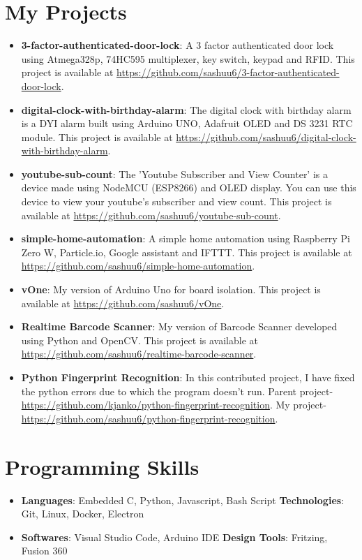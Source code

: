 \documentclass[letterpaper,11pt]{article}
\newcommand{\resumeItem}[2]{
	\item\small{
    		\textbf{#1}{: #2 \vspace{-2pt}}
  	}
}
\newcommand{\resumeSubItem}[2]{\resumeItem{#1}{#2}\vspace{-4pt}}
\newcommand{\resumeSubHeadingListStart}{\begin{itemize}[leftmargin=*]}
\newcommand{\resumeSubHeadingListEnd}{\end{itemize}}
\begin{document}
\section{My Projects}
  	\resumeSubHeadingListStart
    		\resumeSubItem{3-factor-authenticated-door-lock}
      			{ A 3 factor authenticated door lock using Atmega328p, 74HC595 multiplexer, key switch, keypad and RFID. This project is available at \url{https://github.com/sashuu6/3-factor-authenticated-door-lock}.}
    		\resumeSubItem{digital-clock-with-birthday-alarm}
      			{The digital clock with birthday alarm is a DYI alarm built using Arduino UNO, Adafruit OLED and DS 3231 RTC module. This project is available at \url{https://github.com/sashuu6/digital-clock-with-birthday-alarm}.}
    		\resumeSubItem{youtube-sub-count}
      			{The 'Youtube Subscriber and View Counter' is a device made using NodeMCU (ESP8266) and OLED display. You can use this device to view your youtube's subscriber and view count. This project is available at \url{https://github.com/sashuu6/youtube-sub-count}.}
    		\resumeSubItem{simple-home-automation}
      			{A simple home automation using Raspberry Pi Zero W, Particle.io, Google assistant and IFTTT. This project is available at \url{https://github.com/sashuu6/simple-home-automation}.}
      		\resumeSubItem{vOne}
      			{My version of Arduino Uno for board isolation. This project is available at \url{https://github.com/sashuu6/vOne}.}
       		\resumeSubItem{Realtime Barcode Scanner}
      			{My version of Barcode Scanner developed using Python and OpenCV. This project is available at \url{https://github.com/sashuu6/realtime-barcode-scanner}.}
		\resumeSubItem{Python Fingerprint Recognition}
			{In this contributed project, I have fixed the python errors due to which the program doesn't run. Parent project-\url{https://github.com/kjanko/python-fingerprint-recognition}. My project-\url{https://github.com/sashuu6/python-fingerprint-recognition}.}
  	\resumeSubHeadingListEnd

  
\section{Programming Skills}
  	\resumeSubHeadingListStart
    		\item{
      			\textbf{Languages}{: Embedded C, Python, Javascript, Bash Script }
      			\hfill
      			\textbf{Technologies}{: Git, Linux, Docker, Electron }
    		}
		\item{
      			\textbf{Softwares}{: Visual Studio Code, Arduino IDE}
      			\hfill
      			\textbf{Design Tools}{: Fritzing, Fusion 360}
    		}
  	\resumeSubHeadingListEnd

\end{document}
